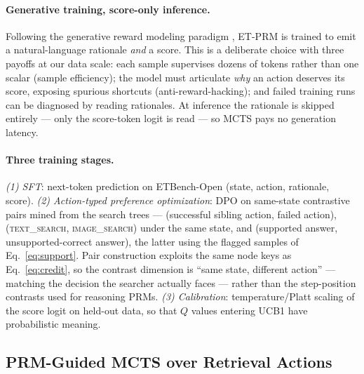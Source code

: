 \documentclass[letterpaper,twocolumn,10pt]{article}
\newcommand{\dataset}{ETBench-Open}
\newcommand{\prm}{ET-PRM}
\begin{document}
\paragraph{Generative training, score-only inference.}
Following the generative reward modeling paradigm
\cite{zhang2024generative,ankner2024critique}, \prm{} is trained to emit a
natural-language rationale \emph{and} a score. This is a deliberate choice
with three payoffs at our data scale: each sample supervises dozens of
tokens rather than one scalar (sample efficiency); the model must
articulate \emph{why} an action deserves its score, exposing spurious
shortcuts (anti-reward-hacking); and failed training runs can be diagnosed
by reading rationales. At inference the rationale is skipped entirely ---
only the score-token logit is read --- so MCTS pays no generation latency.

\paragraph{Three training stages.}
\emph{(1) SFT}: next-token prediction on \dataset{} (state, action,
rationale, score). \emph{(2) Action-typed preference optimization}: DPO
\cite{rafailov2023dpo} on same-state contrastive pairs mined from the
search trees --- (successful sibling action, failed action),
(\textsc{text\_search}, \textsc{image\_search}) under the same state, and
(supported answer, unsupported-correct answer), the latter using the
flagged samples of Eq.~\eqref{eq:support}. Pair construction exploits the
same node keys as Eq.~\eqref{eq:credit}, so the contrast dimension is
``same state, different action'' --- matching the decision the searcher
actually faces --- rather than the step-position contrasts used for
reasoning PRMs. \emph{(3) Calibration}: temperature/Platt scaling of the
score logit on held-out data, so that $Q$ values entering UCB1 have
probabilistic meaning.

\subsection{PRM-Guided MCTS over Retrieval Actions}
\label{sec:search}
\end{document}
